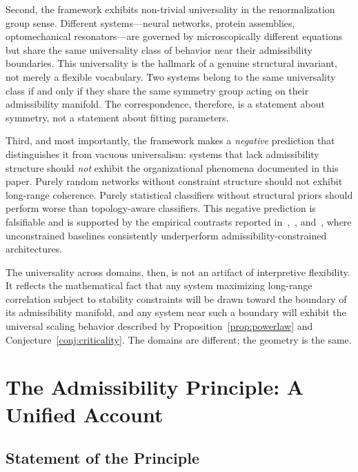 \documentclass[11pt, oneside]{article}
\numberwithin{equation}{section}
\theoremstyle{rsvpstyle}
\theoremstyle{remark}
\begin{document}
Second, the framework exhibits non-trivial universality in the renormalization group
sense. Different systems---neural networks, protein assemblies, optomechanical
resonators---are governed by microscopically different equations but share the same
universality class of behavior near their admissibility boundaries. This universality
is the hallmark of a genuine structural invariant, not merely a flexible vocabulary.
Two systems belong to the same universality class if and only if they share the same
symmetry group acting on their admissibility manifold. The correspondence, therefore,
is a statement about symmetry, not a statement about fitting parameters.

Third, and most importantly, the framework makes a \emph{negative} prediction that
distinguishes it from vacuous universalism: systems that lack admissibility structure
should \emph{not} exhibit the organizational phenomena documented in this paper.
Purely random networks without constraint structure should not exhibit long-range
coherence. Purely statistical classifiers without structural priors should perform
worse than topology-aware classifiers. This negative prediction is falsifiable and
is supported by the empirical contrasts reported in~\cite{Wu2026GNN},~\cite{Taye2026Amharic},
and~\cite{Matas2026BCC}, where unconstrained baselines consistently underperform
admissibility-constrained architectures.

The universality across domains, then, is not an artifact of interpretive flexibility.
It reflects the mathematical fact that any system maximizing long-range correlation
subject to stability constraints will be drawn toward the boundary of its admissibility
manifold, and any system near such a boundary will exhibit the universal scaling
behavior described by Proposition~\ref{prop:powerlaw} and
Conjecture~\ref{conj:criticality}. The domains are different; the geometry is the same.

\section{The Admissibility Principle: A Unified Account}

\subsection{Statement of the Principle}
\end{document}

